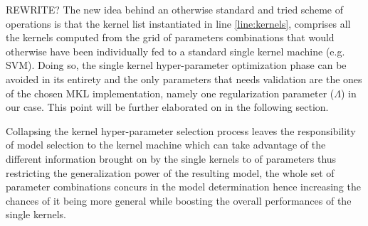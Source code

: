 
REWRITE?
The new idea behind an otherwise standard and tried scheme of operations is that
the kernel list instantiated in line \ref{line:kernels}, comprises all the 
kernels computed from the grid of parameters combinations that would otherwise
have been individually fed to a standard single kernel machine (e.g. SVM).
Doing so, the single kernel hyper-parameter optimization phase can be avoided in its
entirety and the only parameters that needs validation are the ones of the chosen
MKL implementation, namely one regularization parameter ($\Lambda$) in our case.
This point will be further elaborated on in the following section.

Collapsing the kernel hyper-parameter selection process leaves the responsibility
of model selection to the kernel machine which can take advantage of the different
information brought on by the single kernels to 
of parameters thus restricting the generalization power of the resulting model,
the whole set of parameter combinations concurs in the model determination hence
increasing the chances of it being more general while boosting the overall performances
of the single kernels.

%

